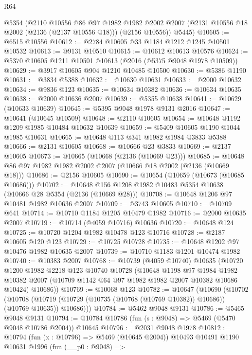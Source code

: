 \begin{lexlean}{R64}
\begin{coremodule}
      @5354
      (@2110
        @10556
        @86
        @97
        @1982
        @1982
        @2002
        @2007
        (@2131 @10556 @18 @2002 (@2136 (@2137 @10556 @18)))
        (@2156 @10556))
      @5445)
@10605 := @6515 @10556
@10612 := @2784 @10605 @33 @1184 @1212 @1245 @10501 @10532
@10613 := @9131 @10510
@10615 := @10612 @10613 @10576
@10624 := @5370 @10605 @1211 @10501 @10613 (@2016 (@5375 @9048 @1978 @10509))
@10629 := @3917 @10605 @904 @1210 @10485 @10500
@10630 := @5386 @1190
@10631 := @3834 @5388
@10632 := @10630 @10631
@10633 := @2000 @10632
@10634 := @9836 @123
@10635 := @10634 @10382
@10636 := @10634 @10635
@10638 := @2000 @10636 @2007
@10639 := @5355 @10638
@10641 := @10629 (@10633 @10639)
@10645 := @5395 @9048 @1978 @9131 @2016
@10647 := @10641 (@10645 @10509)
@10648 := @2110 @10605
@10654 := @10648 @1192 @1209 @1985 @10484 @10632 @10639
@10659 := @5409 @10605 @1190 @1044 @1985 @10631
@10665 := @10648 @113 @341 @1982 @1984 @3833 @5388
@10666 := @2131 @10605
@10668 := @10666 @23 @3833
@10669 := @2137 @10605
@10673 := @10665 (@10668 (@2136 (@10669 @23)))
@10685 := @10648 @86 @97 @1982 @1982 @2002 @2007 (@10666 @18 @2002 (@2136 (@10669 @18)))
@10686 := @2156 @10605
@10690 := @10654 (@10659 (@10673 (@10685 @10686)))
@10702 := @10648 @156 @1208 @1982 @10483 @5354 @10638 (@10666 @28 @5354 (@2136 (@10669 @28)))
@10708 := @10648 @1206 @97 @10481 @1982 @10636 @2007
@10709 := @3743 @10605
@10710 := @10709 @641
@10714 := @10710 @1184 @1205 @10479 @1982
@10716 := @2000 @10635 @2007
@10719 := @10714 (@4059 @10716) @10636
@10720 := @10648 @124
@10725 := @10720 @1204 @1982 @10478 @123 @10716
@10728 := @2187 @10605 @120 @123
@10729 := @10725 @10728
@10735 := @10648 @1202 @97 @10476 @1982 @10635 @2007
@10739 := @10710 @1183 @1201 @10474 @1982
@10740 := @10383 @2007
@10768 := @10739
    (@4059 @10740)
    @10635
    (@10720
      @1200
      @1982
      @2218
      @123
      @10740
      @10728
      (@10648
        @1198
        @97
        @1984
        @1982
        @10382
        @2007
        (@10709 @1142 @64 @97 @1982 @1982 @2007 @10382 @10686 @10424)
        @10686))
@10769 := @10068 @123
@10782 := @10647
    (@10690
      (@10702
        (@10708 (@10719 (@10729 (@10735 (@10768 (@10769 @10382)) @10686)) (@10769 @10635)) @10686)))
@10784 := @5462 @9048 @9131
@10786 := @5465 @9048 @9131
@10794 := @10784 @10786 (fun (s : @9048) => @5469 (@5470 @9048 @10786 @2004)) @10645
@10796 := @2031 @9048 @1978
@10812 := @10794
    (fun (x : @10796) => @5469 (@10645 @2004))
    @10493
    @10491
    @1190
    @10631
    @1996
    (fun (__p0 : @9048) =>

\end{coremodule}
\end{lexlean}

